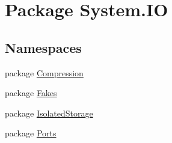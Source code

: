 \hypertarget{namespace_system_1_1_i_o}{\section{Package System.\-I\-O}
\label{namespace_system_1_1_i_o}
}
\subsection*{Namespaces}
\begin{DoxyCompactItemize}
\item 
package \hyperlink{namespace_system_1_1_i_o_1_1_compression}{Compression}
\item 
package \hyperlink{namespace_system_1_1_i_o_1_1_fakes}{Fakes}
\item 
package \hyperlink{namespace_system_1_1_i_o_1_1_isolated_storage}{Isolated\-Storage}
\item 
package \hyperlink{namespace_system_1_1_i_o_1_1_ports}{Ports}
\end{DoxyCompactItemize}

